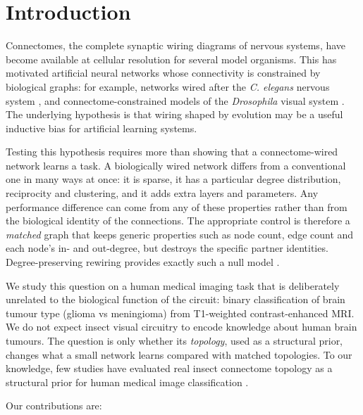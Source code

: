 \section{Introduction}
\label{sec:01_introduction}

Connectomes, the complete synaptic wiring diagrams of nervous systems, have become available at cellular resolution for several model organisms. This has motivated artificial neural networks whose connectivity is constrained by biological graphs: for example, networks wired after the \emph{C. elegans} nervous system \cite{ncnn} , and connectome-constrained models of the \emph{Drosophila} visual system \cite{flyvis} . The underlying hypothesis is that wiring shaped by evolution may be a useful inductive bias for artificial learning systems.

Testing this hypothesis requires more than showing that a connectome-wired network learns a task. A biologically wired network differs from a conventional one in many ways at once: it is sparse, it has a particular degree distribution, reciprocity and clustering, and it adds extra layers and parameters. Any performance difference can come from any of these properties rather than from the biological identity of the connections. The appropriate control is therefore a \emph{matched} graph that keeps generic properties such as node count, edge count and each node's in- and out-degree, but destroys the specific partner identities. Degree-preserving rewiring provides exactly such a null model .

We study this question on a human medical imaging task that is deliberately unrelated to the biological function of the circuit: binary classification of brain tumour type (glioma vs meningioma) from T1-weighted contrast-enhanced MRI. We do not expect insect visual circuitry to encode knowledge about human brain tumours. The question is only whether its \emph{topology}, used as a structural prior, changes what a small network learns compared with matched topologies. To our knowledge, few studies have evaluated real insect connectome topology as a structural prior for human medical image classification .

Our contributions are:

